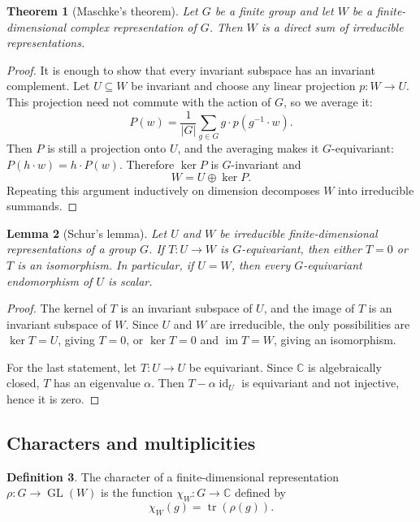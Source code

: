 \documentclass[12pt,a4paper]{article}
\newtheorem{theorem}{Theorem}[section]
\newtheorem{lemma}[theorem]{Lemma}
\theoremstyle{definition}
\newtheorem{definition}[theorem]{Definition}
\theoremstyle{remark}
\newcommand{\C}{\mathbb{C}}
\newcommand{\GL}{\operatorname{GL}}
\newcommand{\tr}{\operatorname{tr}}
\newcommand{\id}{\operatorname{id}}
\begin{document}
\begin{theorem}[Maschke's theorem]
Let \(G\) be a finite group and let \(W\) be a finite-dimensional complex
representation of \(G\).  Then \(W\) is a direct sum of irreducible
representations.
\end{theorem}

\begin{proof}
It is enough to show that every invariant subspace has an invariant
complement.  Let \(U\subseteq W\) be invariant and choose any linear
projection \(p:W\to U\).  This projection need not commute with the action of
\(G\), so we average it:
\[
P(w)=\frac{1}{|G|}\sum_{g\in G}g\cdot p(g^{-1}\cdot w).
\]
Then \(P\) is still a projection onto \(U\), and the averaging makes it
\(G\)-equivariant: \(P(h\cdot w)=h\cdot P(w)\).  Therefore \(\ker P\) is
\(G\)-invariant and
\[
W=U\oplus \ker P.
\]
Repeating this argument inductively on dimension decomposes \(W\) into
irreducible summands.
\end{proof}

\begin{lemma}[Schur's lemma]
Let \(U\) and \(W\) be irreducible finite-dimensional representations of a
group \(G\).  If \(T:U\to W\) is \(G\)-equivariant, then either \(T=0\) or
\(T\) is an isomorphism.  In particular, if \(U=W\), then every
\(G\)-equivariant endomorphism of \(U\) is scalar.
\end{lemma}

\begin{proof}
The kernel of \(T\) is an invariant subspace of \(U\), and the image of \(T\)
is an invariant subspace of \(W\).  Since \(U\) and \(W\) are irreducible,
the only possibilities are \(\ker T=U\), giving \(T=0\), or
\(\ker T=0\) and \(\operatorname{im}T=W\), giving an isomorphism.

For the last statement, let \(T:U\to U\) be equivariant.  Since \(\C\) is
algebraically closed, \(T\) has an eigenvalue \(\alpha\).  Then
\(T-\alpha \id_U\) is equivariant and not injective, hence it is zero.
\end{proof}

\subsection{Characters and multiplicities}

\begin{definition}
The character of a finite-dimensional representation \(\rho:G\to\GL(W)\) is
the function \(\chi_W:G\to \C\) defined by
\[
\chi_W(g)=\tr(\rho(g)).
\]
\end{definition}
\end{document}

